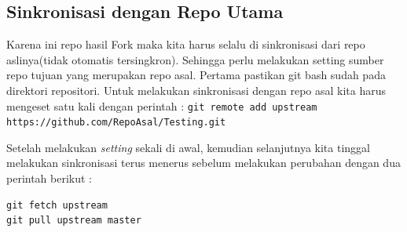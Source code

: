 \subsection{Sinkronisasi dengan Repo Utama}
Karena ini repo hasil Fork maka kita harus selalu di sinkronisasi dari repo aslinya(tidak otomatis tersingkron). Sehingga perlu melakukan setting sumber repo tujuan yang merupakan repo asal. Pertama pastikan git bash sudah pada direktori repositori. Untuk melakukan sinkronisasi dengan repo asal kita harus mengeset satu kali dengan perintah :
\verb|git remote add upstream https://github.com/RepoAsal/Testing.git|

Setelah melakukan \textit{setting} sekali di awal, kemudian selanjutnya kita tinggal melakukan sinkronisasi terus menerus sebelum melakukan perubahan dengan dua perintah berikut :
\begin{verbatim}
git fetch upstream
git pull upstream master
\end{verbatim}


